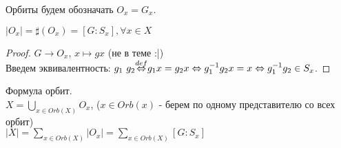Орбиты будем обозначать $O_x = G_x$.

\begin{thm}
$|O_x| = \sharp(O_x) = [G : S_x], \forall x \in X$
\end{thm}
\begin{proof}
$G \rightarrow O_x$, $x \mapsto gx$ (не в теме :|)\\
Введем эквивалентность: $g_1 ~ g_2 {\buildrel{def}\over{\Leftrightarrow}} g_1x = g_2x
\Leftrightarrow g^{-1}_1g_2x = x \Leftrightarrow g^{-1}_1g_2 \in S_x$.
\end{proof}

\begin{thm}
Формула орбит. \\
$X = {\underset{x \in Orb(X)}{\bigcup}}O_x$, ($x \in Orb(x)$ - берем по одному представителю со всех орбит) \\
$|X| = {\underset{x \in Orb(X)}{\sum}}|O_x| = {\underset{x \in Orb(X)}{\sum}}[G : S_x]$
\end{thm}


